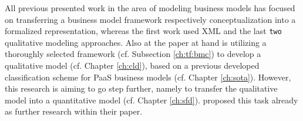 All previous presented work in the area of modeling business models has focused on transferring a business model framework respectively conceptualization into a formalized representation, whereas the first work used \ac{XML} and the last \texttt{two} qualitative modeling approaches. Also at the paper at hand is utilizing a thoroughly selected framework (cf. Subsection \ref{ch:tf:bmc}) to develop a qualitative model (cf. Chapter \ref{ch:cld}), based on a previous developed classification scheme for \ac{PaaS} business models (cf. Chapter \ref{ch:sota}). However, this research is aiming to go step further, namely to transfer the qualitative model into a quantitative model (cf. Chapter \ref{ch:sfd}). \citet{Kiani2009} proposed this task already as further research within their paper.